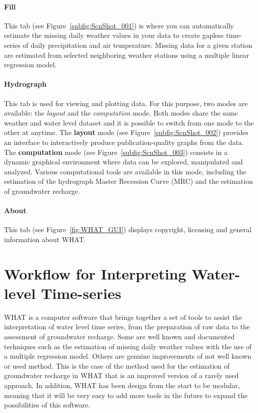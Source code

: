 \documentclass[WHATMANUAL.tex]{subfiles}
\begin{document}
\paragraph{Fill} This tab (see Figure~\ref{subfig:ScnShot_001}) is where you can automatically estimate the missing daily weather values in your data to create gapless time-series of daily precipitation and air temperature. Missing data for a given station are estimated from selected neighboring weather stations using a multiple linear regression model.

\paragraph{Hydrograph} This tab is used for viewing and plotting data. For this purpose, two modes are available: the \emph{layout} and the \emph{computation} mode. Both modes share the same weather and water level dataset and it is possible to switch from one mode to the other at anytime. The \textbf{layout} mode (see Figure~\ref{subfig:ScnShot_002}) provides an interface to interactively produce publication-quality graphs from the data. The \textbf{computation} mode (see Figure~\ref{subfig:ScnShot_003}) consists in a dynamic graphical environment where data can be explored, manipulated and analyzed. Various computational tools are available in this mode, including the estimation of the hydrograph Master Recession Curve (MRC) and the estimation of groundwater recharge.

\paragraph{About} This tab (see Figure~\ref{fig:WHAT_GUI}) displays copyright, licensing and general information about WHAT.

\section{Workflow for Interpreting Water-level Time-series}\label{sec:workflow}

WHAT is a computer software that brings together a set of tools to assist the interpretation of water level time series, from the preparation of raw data to the assessment of groundwater recharge. Some are well known and documented techniques such as the estimation of missing daily weather values with the use of a multiple regression model. Others are genuine improvements of not well known or used method. This is the case of the method used for the estimation of groundwater recharge in WHAT that is an improved version of a rarely used approach. In addition, WHAT has been design from the start to be modular, meaning that it will be very easy to add more tools in the future to expand the possibilities of this software.
\end{document}
